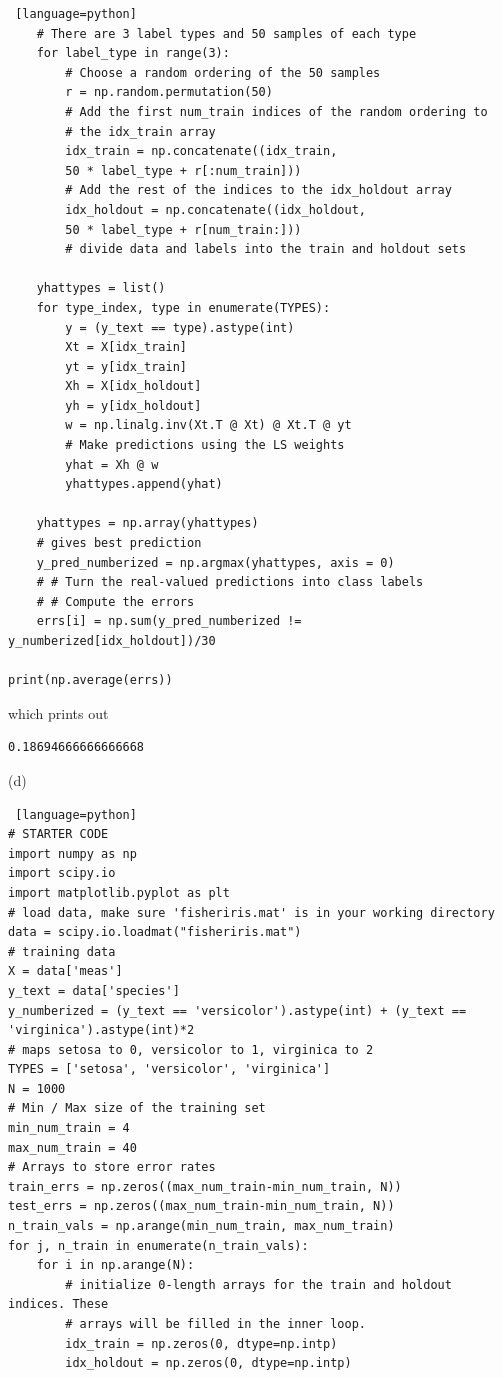 \documentclass[a4paper, 12pt]{article}
\begin{document}
\begin{solution}
\begin{lstlisting} [language=python]
    # There are 3 label types and 50 samples of each type
    for label_type in range(3):
        # Choose a random ordering of the 50 samples
        r = np.random.permutation(50)
        # Add the first num_train indices of the random ordering to
        # the idx_train array
        idx_train = np.concatenate((idx_train,
        50 * label_type + r[:num_train]))
        # Add the rest of the indices to the idx_holdout array
        idx_holdout = np.concatenate((idx_holdout,
        50 * label_type + r[num_train:]))
        # divide data and labels into the train and holdout sets
    
    yhattypes = list()
    for type_index, type in enumerate(TYPES):
        y = (y_text == type).astype(int)
        Xt = X[idx_train]
        yt = y[idx_train]
        Xh = X[idx_holdout]
        yh = y[idx_holdout]
        w = np.linalg.inv(Xt.T @ Xt) @ Xt.T @ yt
        # Make predictions using the LS weights
        yhat = Xh @ w
        yhattypes.append(yhat)
    
    yhattypes = np.array(yhattypes)
    # gives best prediction
    y_pred_numberized = np.argmax(yhattypes, axis = 0)
    # # Turn the real-valued predictions into class labels
    # # Compute the errors
    errs[i] = np.sum(y_pred_numberized != y_numberized[idx_holdout])/30

print(np.average(errs))
\end{lstlisting}
which prints out
\begin{lstlisting}
0.18694666666666668
\end{lstlisting}

(d)
\begin{lstlisting} [language=python]
# STARTER CODE
import numpy as np
import scipy.io
import matplotlib.pyplot as plt
# load data, make sure 'fisheriris.mat' is in your working directory
data = scipy.io.loadmat("fisheriris.mat")
# training data
X = data['meas']
y_text = data['species']
y_numberized = (y_text == 'versicolor').astype(int) + (y_text == 'virginica').astype(int)*2
# maps setosa to 0, versicolor to 1, virginica to 2
TYPES = ['setosa', 'versicolor', 'virginica']
N = 1000
# Min / Max size of the training set
min_num_train = 4
max_num_train = 40
# Arrays to store error rates
train_errs = np.zeros((max_num_train-min_num_train, N))
test_errs = np.zeros((max_num_train-min_num_train, N))
n_train_vals = np.arange(min_num_train, max_num_train)
for j, n_train in enumerate(n_train_vals):
    for i in np.arange(N):
        # initialize 0-length arrays for the train and holdout indices. These
        # arrays will be filled in the inner loop.
        idx_train = np.zeros(0, dtype=np.intp)
        idx_holdout = np.zeros(0, dtype=np.intp)


\end{lstlisting}
\end{solution}
\end{document}
